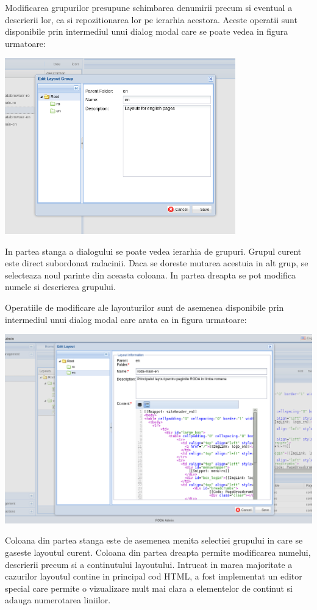 Modificarea grupurilor presupune schimbarea denumirii precum si eventual
a descrierii lor, ca si repozitionarea lor pe ierarhia acestora. Aceste
operatii sunt disponibile prin intermediul unui dialog modal care
se poate vedea in figura urmatoare:

\includegraphics[width=10cm]{cms/backend/layout/cmslayout4}

In partea stanga a dialogului se poate vedea ierarhia de grupuri.
Grupul curent este direct subordonat radacinii. Daca se doreste mutarea
acestuia in alt grup, se selecteaza noul parinte din aceasta coloana.
In partea dreapta se pot modifica numele si descrierea grupului.

Operatiile de modificare ale layouturilor sunt de asemenea disponibile
prin intermediul unui dialog modal care arata ca in figura urmatoare:

\includegraphics[width=15cm]{cms/backend/layout/cmslayout5}

Coloana din partea stanga este de asemenea menita selectiei grupului
in care se gaseste layoutul curent. Coloana din partea dreapta permite
modificarea numelui, descrierii precum si a continutului layoutului.
Intrucat in marea majoritate a cazurilor layoutul contine in principal
cod HTML, a fost implementat un editor special care permite o vizualizare
mult mai clara a elementelor de continut si adauga numerotarea liniilor. 

